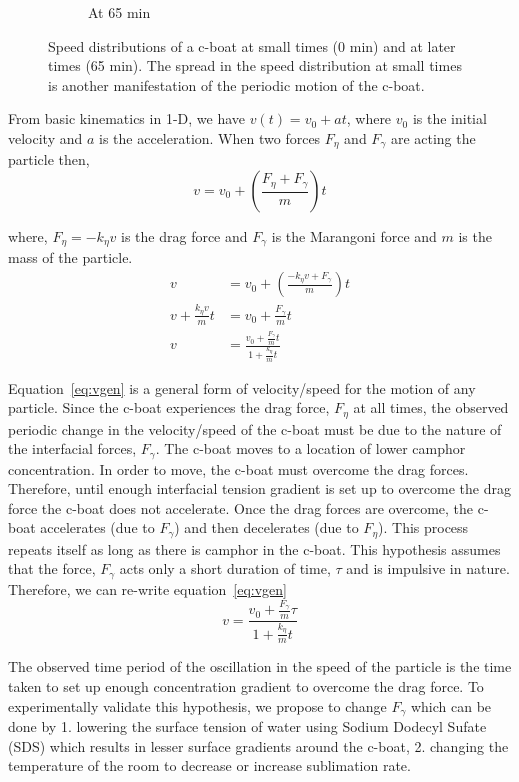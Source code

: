 \documentclass[12pt]{article}
\begin{document}
\begin{figure}[h!]
\begin{subfigure}[h!]{0.5\textwidth}
       \caption{At 65 min}
       \label{fig:vpdf65min}
	\end{subfigure}
	\caption{Speed distributions of a c-boat at small times (0 min) and at later times (65 min). The spread in the speed distribution at small times is another manifestation of the periodic motion of the c-boat.}
	\label{fig:vpdf0and65}
\end{figure}

From basic kinematics in 1-D, we have $v(t) = v_{0}+ at$, where $v_{0}$ is the initial velocity and $a$ is the acceleration. When two forces $F_{\eta}$ and $F_{\gamma}$ are acting the particle then, 
\begin{equation}
v = v_{0} + \left(\frac{F_{\eta} + F_{\gamma}}{m}\right) t
\end{equation}

where, $F_{\eta} = -k_{\eta}v$ is the drag force and $F_{\gamma}$ is the Marangoni force and $m$ is the mass of the particle.
\begin{align}
v &= v_{0} + \left(\frac{-k_{\eta}v + F_{\gamma}}{m}\right)t \nonumber \\
v + \frac{k_{\eta}v}{m}t &= v_{0} + \frac{F_{\gamma}}{m}t \nonumber \\
v &= \frac{v_{0}+\frac{F_{\gamma}}{m}t}{1+\frac{k_{\eta}}{m}t} \label{eq:vgen}
\end{align}

Equation~\ref{eq:vgen} is a general form of velocity/speed for the motion of any particle. Since the c-boat experiences the drag force, $F_{\eta}$ at all times, the observed periodic change in the velocity/speed of the c-boat must be due to the nature of the interfacial forces, $F_{\gamma}$. The c-boat moves to a location of lower camphor concentration. In order to move, the c-boat must overcome the drag forces. Therefore, until enough interfacial tension gradient is set up to overcome the drag force the c-boat does not accelerate. Once the drag forces are overcome, the c-boat accelerates (due to $F_{\gamma}$) and then decelerates (due to $F_{\eta}$). This process repeats itself as long as there is camphor in the c-boat. This hypothesis assumes that the force, $F_{\gamma}$ acts only a short duration of time, $\tau$ and is impulsive in nature. Therefore, we can re-write equation~\ref{eq:vgen}
\begin{equation}\label{eq:vcboat}
v = \frac{v_{0}+\frac{F_{\gamma}}{m}\tau}{1+\frac{k_{\eta}}{m}t}
\end{equation}

The observed time period of the oscillation in the speed of the particle is the time taken to set up enough concentration gradient to overcome the drag force. To experimentally validate this hypothesis, we propose to change $F_{\gamma}$ which can be done by 1. lowering the surface tension of water using Sodium Dodecyl Sufate (SDS) which results in lesser surface gradients around the c-boat, 2. changing the temperature of the room to decrease or increase sublimation rate. 
\end{document}
